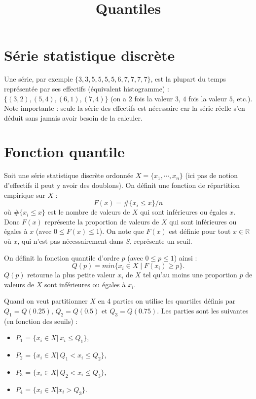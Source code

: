 \documentclass[a4paper, 12]{article}
\newcommand\set[1]{\ensuremath{\{#1\}}}
\begin{document}
\title{Quantiles}
\date{}
\maketitle

\section{Série statistique discrète}
Une série, par exemple $\set{3,3,5,5,5,5,6,7,7,7,7}$, est la plupart du temps représentée par ses effectifs (équivalent histogramme) :$\set{(3,2), (5,4), (6,1), (7,4)}$ (on a $2$ fois la valeur $3$, $4$ fois la valeur $5$, etc.). 
Note importante : seule la série des effectifs est nécessaire car la série réelle s'en déduit sans jamais avoir besoin de la calculer.


\section{Fonction quantile}
Soit une série statistique discrète ordonnée $X = \set{x_1, \cdots, x_n}$ (ici pas de notion d’effectifs il peut y avoir des doublons). On définit une fonction de répartition empirique sur $X$ :
$$F(x) = \#\set{x_i \le x}/n$$ où $\#\set{x_i \le x}$ est le nombre de valeurs de $X$ qui sont inférieures ou égales $x$.
Donc $F(x)$ représente la proportion de valeurs de $X$ qui sont inférieures ou égales à $x$  (avec $0 \le F(x) \le 1$). On note que $F(x)$ est définie pour tout $x \in \mathbb{R}$ où $x$, qui n’est pas nécessairement dans $S$, représente un seuil.

On définit la fonction quantile d’ordre $p$ (avec $0 \le p \le 1$) ainsi : $$Q(p) = min\set{x_i \in X \; | \; F(x_i) \ge p}.$$
$Q(p)$ retourne la plus petite valeur $x_i$ de $X$ tel qu’au moins une proportion $p$ de valeurs de $X$ sont inférieures ou égales à $x_i$. 

Quand on veut partitionner $X$ en 4 parties on utilise les quartiles définis par 
$Q_1 = Q(0.25)$, $Q_2 = Q(0.5)$ et $Q_3 = Q(0.75)$.  
Les parties sont les suivantes (en fonction des seuils) :
\begin{itemize}
	\item $P_1$ = $\set{x_i \in X   | \ x_i \le Q_1}$,
	\item $P_2$ = $\set{x_i \in X   | \ Q_1 < x_i \le Q_2}$,
	\item $P_3$ = $\set{x_i \in X   | \ Q_2 < x_i \le Q_3}$,
	\item $P_4$ = $\set{x_i \in X   | x_i > Q_3}$.
\end{itemize}
\end{document}
